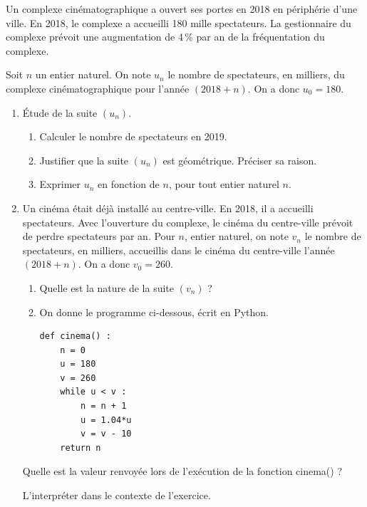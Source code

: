 \medskip

Un complexe cinématographique a ouvert ses portes en 2018 en périphérie d'une ville.
En 2018, le complexe a accueilli 180 mille spectateurs. La gestionnaire du complexe prévoit une augmentation de 4\,\% par an de la fréquentation du complexe.

Soit $n$ un entier naturel. On note $u_n$ le nombre de spectateurs, en milliers, du complexe cinématographique pour l'année $(2018+n)$. On a donc $u_0=180$.

\medskip

\begin{enumerate}
\item  Étude de la suite $\left(u_n\right)$.
	\begin{enumerate}
		\item  Calculer le nombre de spectateurs en 2019.
		\item Justifier que la suite $\left(u_n\right)$ est géométrique. Préciser sa raison.
		\item Exprimer $u_n$ en fonction de $n$, pour tout entier naturel $n$.
	\end{enumerate}
\item Un cinéma était déjà installé au centre-ville. En 2018, il a accueilli  spectateurs. Avec l'ouverture du complexe, le cinéma du centre-ville prévoit de perdre  spectateurs par an.
Pour $n$, entier naturel, on note $v_n$ le nombre de spectateurs, en milliers, accueillis dans le cinéma du centre-ville l'année $(2018 + n)$. On a donc $v_0 = 260$.
	\begin{enumerate}
		\item Quelle est la nature de la suite $\left(v_n\right)$ ?
		\item On donne le programme ci-dessous, écrit en Python.

\begin{lstlisting}[style=python]
def cinema() :
	n = 0
	u = 180
	v = 260
	while u < v :
		n = n + 1
		u = 1.04*u
		v = v - 10
	return n
\end{lstlisting}
	\end{enumerate}
Quelle est la valeur renvoyée lors de l'exécution de la fonction cinema() ? 

L'interpréter dans le contexte de l'exercice.
\end{enumerate}

\vspace{0,5cm}
